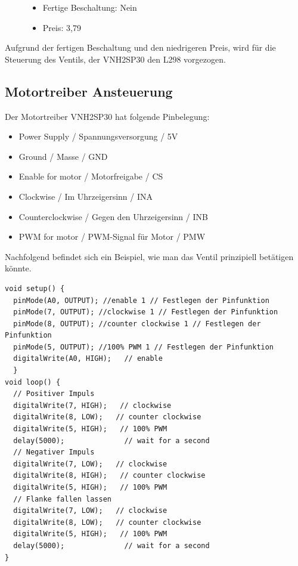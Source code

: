 \begin{figure}[H]
\begin{minipage}[t]{0.6\textwidth}
\begin{itemize}
	\item{Fertige Beschaltung: Nein}
	\item{Preis: 3,79\textsf{\texteuro}} %
\end{itemize}

\end{minipage}
\end{figure} 

Aufgrund der fertigen Beschaltung und den niedrigeren Preis, wird für die Steuerung des Ventils, der VNH2SP30 den L298 vorgezogen. 

\subsection{Motortreiber Ansteuerung}
\label{sec:motortreiberAnsteuerung}

Der Motortreiber VNH2SP30 hat folgende Pinbelegung:

\begin{itemize}
	\item{Power Supply / Spannungsversorgung / 5V}
	\item{Ground / Masse / GND}
	\item{Enable for motor / Motorfreigabe / CS}
	\item{Clockwise / Im Uhrzeigersinn / INA}
	\item{Counterclockwise / Gegen den Uhrzeigersinn / INB}
	\item{PWM for motor / PWM-Signal für Motor / PMW}
\end{itemize}

Nachfolgend befindet sich ein Beispiel, wie man das Ventil prinzipiell betätigen könnte.

\begin{lstlisting}[language=Arduino]
void setup() {
  pinMode(A0, OUTPUT); //enable 1 // Festlegen der Pinfunktion
  pinMode(7, OUTPUT); //clockwise 1 // Festlegen der Pinfunktion
  pinMode(8, OUTPUT); //counter clockwise 1 // Festlegen der Pinfunktion
  pinMode(5, OUTPUT); //100% PWM 1 // Festlegen der Pinfunktion
  digitalWrite(A0, HIGH);   // enable
  }
void loop() {
  // Positiver Impuls
  digitalWrite(7, HIGH);   // clockwise
  digitalWrite(8, LOW);   // counter clockwise 
  digitalWrite(5, HIGH);   // 100% PWM
  delay(5000);              // wait for a second
  // Negativer Impuls
  digitalWrite(7, LOW);   // clockwise
  digitalWrite(8, HIGH);   // counter clockwise 
  digitalWrite(5, HIGH);   // 100% PWM 
  // Flanke fallen lassen
  digitalWrite(7, LOW);   // clockwise
  digitalWrite(8, LOW);   // counter clockwise 
  digitalWrite(5, HIGH);   // 100% PWM
  delay(5000);              // wait for a second
}
\end{lstlisting}


